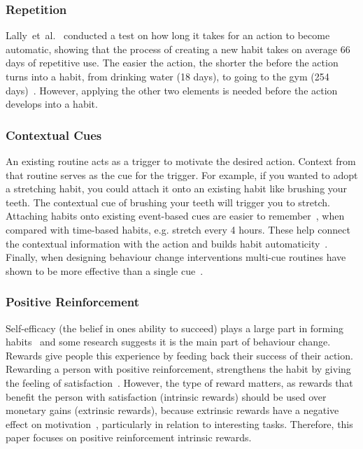 \documentclass{scaffold/sigchi}
\begin{document}
\subsubsection{Repetition}
Lally~et~al.~\cite{article_how_habits_formed_modelling_habit_formation} conducted a test on how long it takes for an action to become automatic, showing that the process of creating a new habit takes on average 66 days of repetitive use. The easier the action, the shorter the before the action turns into a habit, from drinking water (18 days), to going to the gym (254 days)~\cite{article_how_habits_formed_modelling_habit_formation}. However, applying the other two elements is needed before the action develops into a habit.

\subsubsection{Contextual Cues}
An existing routine acts as a trigger to motivate the desired action. Context from that routine serves as the cue for the trigger. For example, if you wanted to adopt a stretching habit, you could attach it onto an existing habit like brushing your teeth. The contextual cue of brushing your teeth will trigger you to stretch. Attaching habits onto existing event-based cues are easier to remember~\cite{article_implementation_intentions_multicue}, when compared with time-based habits, e.g. stretch every 4 hours. These help connect the contextual information with the action and builds habit automaticity~\cite{article_implementation_intentions}. Finally, when designing behaviour change interventions multi-cue routines have shown to be more effective than a single cue~\cite{article_understanding_use_contextual_cues_design_impl}.

\subsubsection{Positive Reinforcement}
Self-efficacy (the belief in ones ability to succeed) plays a large part in forming habits~\cite{article_a_self_efficacy} and some research suggests it is the main part of behaviour change. Rewards give people this experience by feeding back their success of their action. Rewarding a person with positive reinforcement, strengthens the habit by giving the feeling of satisfaction~\cite{article_promoting_habit_formation}. However, the type of reward matters, as rewards that benefit the person with satisfaction (intrinsic rewards) should be used over monetary gains (extrinsic rewards), because extrinsic rewards have a negative effect on motivation~\cite{article_meta_analytic_review_intrinsic_motivation}, particularly in relation to interesting tasks. Therefore, this paper focuses on positive reinforcement intrinsic rewards.
\end{document}
